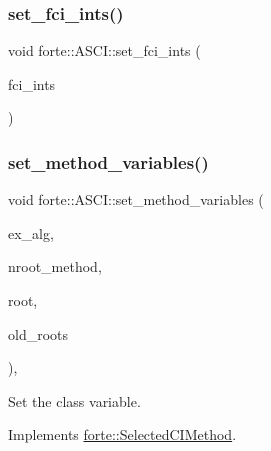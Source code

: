 \subsubsection{\texorpdfstring{set\+\_\+fci\+\_\+ints()}{set\_fci\_ints()}}
{\footnotesize\ttfamily void forte\+::\+A\+S\+C\+I\+::set\+\_\+fci\+\_\+ints (\begin{DoxyParamCaption}\item[{std\+::shared\+\_\+ptr$<$ \mbox{\hyperlink{classforte_1_1_active_space_integrals}{Active\+Space\+Integrals}} $>$}]{fci\+\_\+ints }\end{DoxyParamCaption})}

\mbox{\label{classforte_1_1_a_s_c_i_aaf84a9fa2ec4f80da2cc05ac7ac544f9}} 
\subsubsection{\texorpdfstring{set\+\_\+method\+\_\+variables()}{set\_method\_variables()}}
{\footnotesize\ttfamily void forte\+::\+A\+S\+C\+I\+::set\+\_\+method\+\_\+variables (\begin{DoxyParamCaption}\item[{std\+::string}]{ex\+\_\+alg,  }\item[{size\+\_\+t}]{nroot\+\_\+method,  }\item[{size\+\_\+t}]{root,  }\item[{const std\+::vector$<$ std\+::vector$<$ std\+::pair$<$ \mbox{\hyperlink{namespaceforte_a2076c63fd7b8732004d9e1442ce527c1}{Determinant}}, double $>$$>$$>$ \&}]{old\+\_\+roots }\end{DoxyParamCaption})\hspace{0.3cm}{\ttfamily [override]}, {\ttfamily [virtual]}}



Set the class variable. 



Implements \mbox{\hyperlink{classforte_1_1_selected_c_i_method_a37f95503d0241387195dc7d412fc6e78}{forte\+::\+Selected\+C\+I\+Method}}.

\mbox{\label{classforte_1_1_a_s_c_i_a7b219391b694de5192f5a467f64f60c4}} 
